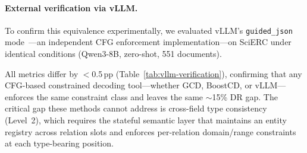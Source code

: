 \paragraph{External verification via vLLM.}
To confirm this equivalence experimentally, we evaluated vLLM's \texttt{guided\_json} mode~\cite{kwon2023vllm}---an independent CFG enforcement implementation---on SciERC under identical conditions (Qwen3-8B, zero-shot, 551 documents).

\begin{table}[h]
\centering
\small
{}
\caption{GCD-equivalence verification: OntoCoDec grammar-only vs.\ vLLM \texttt{guided\_json} on SciERC (Qwen3-8B, zero-shot, 551 documents). All differences $<$0.5\,pp, confirming that CFG-based approaches---regardless of implementation---leave ${\sim}$15\% DR violations unaddressed.}
\label{tab:vllm-verification}
\end{table}

All metrics differ by $<$0.5\,pp (Table~\ref{tab:vllm-verification}), confirming that any CFG-based constrained decoding tool---whether GCD, BoostCD, or vLLM---enforces the same constraint class and leaves the same ${\sim}$15\% DR gap.
The critical gap these methods cannot address is cross-field type consistency (Level~2), which requires the stateful semantic layer that maintains an entity registry across relation slots and enforces per-relation domain/range constraints at each type-bearing position.
